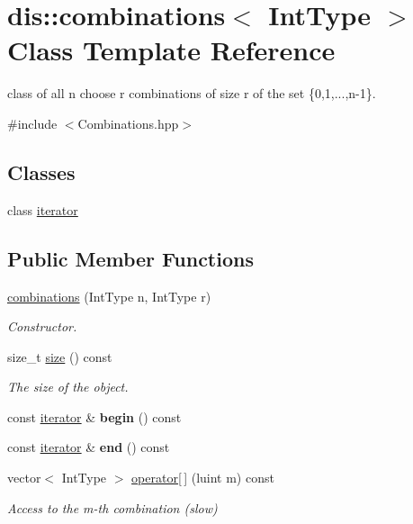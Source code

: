 \hypertarget{classdis_1_1combinations}{\section{dis\-:\-:combinations$<$ Int\-Type $>$ Class Template Reference}
\label{classdis_1_1combinations}
}


class of all n choose r combinations of size r of the set \{0,1,...,n-\/1\}.  




{\ttfamily \#include $<$Combinations.\-hpp$>$}

\subsection*{Classes}
\begin{DoxyCompactItemize}
\item 
class \hyperlink{classdis_1_1combinations_1_1iterator}{iterator}
\end{DoxyCompactItemize}
\subsection*{Public Member Functions}
\begin{DoxyCompactItemize}
\item 
\hyperlink{classdis_1_1combinations_add89ccf03171ecf9fcb58e09416c4b7b}{combinations} (Int\-Type n, Int\-Type r)
\begin{DoxyCompactList}\small\item\em Constructor. \end{DoxyCompactList}\item 
size\-\_\-t \hyperlink{classdis_1_1combinations_a7404f4f47a971f2b6f1acbe3a1e73d6b}{size} () const 
\begin{DoxyCompactList}\small\item\em The size of the object. \end{DoxyCompactList}\item 
\hypertarget{classdis_1_1combinations_ae4cfd43aa62f18e07518177854b02d05}{const \hyperlink{classdis_1_1combinations_1_1iterator}{iterator} \& {\bfseries begin} () const }\label{classdis_1_1combinations_ae4cfd43aa62f18e07518177854b02d05}

\item 
\hypertarget{classdis_1_1combinations_a19774bc8f0790c4ae53c7d7a9b4613da}{const \hyperlink{classdis_1_1combinations_1_1iterator}{iterator} \& {\bfseries end} () const }\label{classdis_1_1combinations_a19774bc8f0790c4ae53c7d7a9b4613da}

\item 
vector$<$ Int\-Type $>$ \hyperlink{classdis_1_1combinations_adbb9b42c752097e0293db31959acca97}{operator\mbox{[}$\,$\mbox{]}} (luint m) const 
\begin{DoxyCompactList}\small\item\em Access to the m-\/th combination (slow) \end{DoxyCompactList}\end{DoxyCompactItemize}


